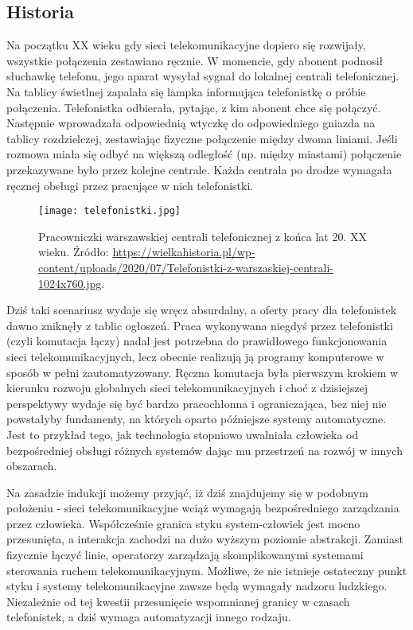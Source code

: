 \subsection{Historia}

Na początku XX wieku gdy sieci telekomunikacyjne dopiero się rozwijały, wszystkie połączenia zestawiano ręcznie. W momencie, gdy abonent podnosił słuchawkę telefonu, jego aparat wysyłał sygnał do lokalnej centrali telefonicznej. Na tablicy świetlnej zapalała się lampka informująca telefonistkę o próbie połączenia. Telefonistka odbierała, pytając, z kim abonent chce się połączyć. Następnie wprowadzała odpowiednią wtyczkę do odpowiedniego gniazda na tablicy rozdzielczej, zestawiając fizyczne połączenie między dwoma liniami. Jeśli rozmowa miała się odbyć na większą odległość (np. między miastami) połączenie przekazywane było przez kolejne centrale. Każda centrala po drodze wymagała ręcznej obsługi przez pracujące w nich telefonistki. 

\begin{figure}[!htbp]
    \centering \texttt{[image: telefonistki.jpg]}
    \caption{Pracowniczki warszawskiej centrali telefonicznej z końca lat 20. XX wieku. Źródło: \url{https://wielkahistoria.pl/wp-content/uploads/2020/07/Telefonistki-z-warszaskiej-centrali-1024x760.jpg}.}\label{fig:telefonistki}
\end{figure}

Dziś taki scenariusz wydaje się wręcz absurdalny, a oferty pracy dla telefonistek dawno zniknęły z tablic ogłoszeń. Praca wykonywana niegdyś przez telefonistki (czyli komutacja łączy) nadal jest potrzebna do prawidłowego funkcjonowania sieci telekomunikacyjnych, lecz obecnie realizują ją programy komputerowe w sposób w pełni zautomatyzowany. Ręczna komutacja była pierwszym krokiem w kierunku rozwoju globalnych sieci telekomunikacyjnych i choć z dzisiejszej perspektywy wydaje się być bardzo pracochłonna i ograniczająca, bez niej nie powstałyby fundamenty, na których oparto późniejsze systemy automatyczne. Jest to przykład tego, jak technologia stopniowo uwalniała człowieka od bezpośredniej obsługi różnych systemów dając mu przestrzeń na rozwój w innych obszarach.

Na zasadzie indukcji możemy przyjąć, iż dziś znajdujemy się w podobnym położeniu - sieci telekomunikacyjne wciąż wymagają bezpośredniego zarządzania przez człowieka. Współcześnie granica styku system-człowiek jest mocno przesunięta, a interakcja zachodzi na dużo wyższym poziomie abstrakcji. Zamiast fizycznie łączyć linie, operatorzy zarządzają skomplikowanymi systemami sterowania ruchem telekomunikacyjnym. Możliwe, że nie istnieje ostateczny punkt styku i systemy telekomunikacyjne zawsze będą wymagały nadzoru ludzkiego. Niezależnie od tej kwestii przesunięcie wspomnianej granicy w czasach telefonistek, a dziś wymaga automatyzacji innego rodzaju. 

